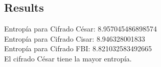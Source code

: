 \documentclass[a4,10pt]{article}
\begin{document}
\subsection{Results}

Entropía para Cifrado César: 8.957045486898574 \\
Entropía para Cifrado Cisar: 8.946328001833 \\
Entropía para Cifrado FBI: 8.821032583492665 \\
El cifrado César tiene la mayor entropía. \\

\printbibliography
\end{document}
